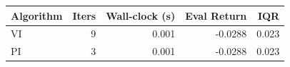 \begin{tabular}{lrrrr}
\hline
\textbf{Algorithm} & \textbf{Iters} & \textbf{Wall-clock (s)} & \textbf{Eval Return} & \textbf{IQR} \\
\hline
VI & 9 & 0.001 & -0.0288 & 0.023 \\
PI & 3 & 0.001 & -0.0288 & 0.023 \\
\hline
\end{tabular}

